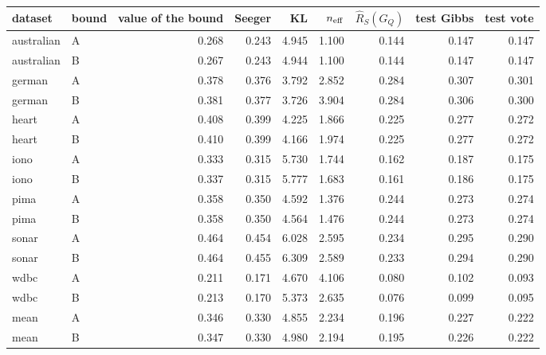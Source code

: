 \begin{tabular}{llrrrrrrr}
\toprule
dataset & bound & value of the bound & Seeger & KL & $n_{\rm eff}$ & $\widehat R_S(G_Q)$ & test Gibbs & test vote \\
\midrule
australian & A & 0.268 & 0.243 & 4.945 & 1.100 & 0.144 & 0.147 & 0.147 \\
australian & B & 0.267 & 0.243 & 4.944 & 1.100 & 0.144 & 0.147 & 0.147 \\
german & A & 0.378 & 0.376 & 3.792 & 2.852 & 0.284 & 0.307 & 0.301 \\
german & B & 0.381 & 0.377 & 3.726 & 3.904 & 0.284 & 0.306 & 0.300 \\
heart & A & 0.408 & 0.399 & 4.225 & 1.866 & 0.225 & 0.277 & 0.272 \\
heart & B & 0.410 & 0.399 & 4.166 & 1.974 & 0.225 & 0.277 & 0.272 \\
iono & A & 0.333 & 0.315 & 5.730 & 1.744 & 0.162 & 0.187 & 0.175 \\
iono & B & 0.337 & 0.315 & 5.777 & 1.683 & 0.161 & 0.186 & 0.175 \\
pima & A & 0.358 & 0.350 & 4.592 & 1.376 & 0.244 & 0.273 & 0.274 \\
pima & B & 0.358 & 0.350 & 4.564 & 1.476 & 0.244 & 0.273 & 0.274 \\
sonar & A & 0.464 & 0.454 & 6.028 & 2.595 & 0.234 & 0.295 & 0.290 \\
sonar & B & 0.464 & 0.455 & 6.309 & 2.589 & 0.233 & 0.294 & 0.290 \\
wdbc & A & 0.211 & 0.171 & 4.670 & 4.106 & 0.080 & 0.102 & 0.093 \\
wdbc & B & 0.213 & 0.170 & 5.373 & 2.635 & 0.076 & 0.099 & 0.095 \\
mean & A & 0.346 & 0.330 & 4.855 & 2.234 & 0.196 & 0.227 & 0.222 \\
mean & B & 0.347 & 0.330 & 4.980 & 2.194 & 0.195 & 0.226 & 0.222 \\
\bottomrule
\end{tabular}
